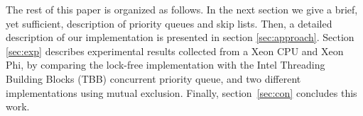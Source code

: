 The rest of this paper is organized as follows.
In the next section we give a brief, yet sufficient, description of priority queues and skip lists. 
Then, a detailed description of our implementation is presented in section \ref{sec:approach}.
Section \ref{sec:exp} describes experimental results collected from a Xeon CPU and Xeon Phi, by comparing the lock-free implementation with the Intel Threading Building Blocks (TBB) concurrent priority queue, and two different implementations using mutual exclusion.
Finally, section~\ref{sec:con} concludes this work.


